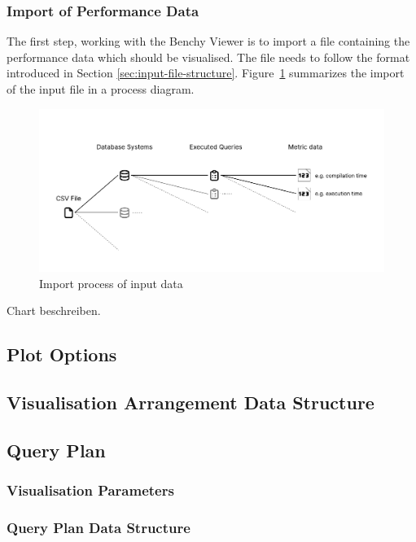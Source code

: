 \subsubsection{Import of Performance Data}

The first step, working with the Benchy Viewer is to import a file containing the performance data which should be visualised. The file needs to follow the format introduced in Section \ref{sec:input-file-structure}. Figure~\ref{fig:input-process-flow} summarizes the import of the input file in a process diagram.

\begin{figure}[h]
  \centering
  \includegraphics[width=1\linewidth]{figures/csv-structure.pdf}
  \caption{Import process of input data}
  \label{fig:input-process-flow}
\end{figure}

Chart beschreiben.


\subsection{Plot Options}
\subsection{Visualisation Arrangement Data Structure}
\subsection{Query Plan}
\subsubsection{Visualisation Parameters}
\subsubsection{Query Plan Data Structure}

